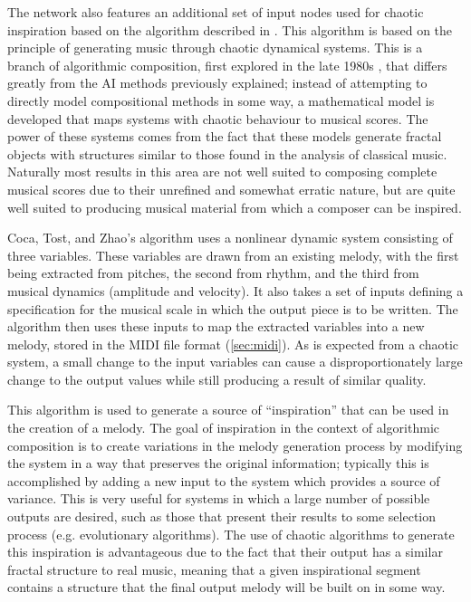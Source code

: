 \documentclass[ author={Stephen Livermore-Tozer},
				supervisor={Dr. Peter Flach},
				degree={MEng},
				title={Algorithmic Co-composition Using Machine Learning},
				subtitle={},
				type={research},
				year={2016} ]{dissertation}
\begin{document}
	The network also features an additional set of input nodes used for chaotic inspiration based on the algorithm described in \cite{coca2010characterizing}. This algorithm is based on the principle of generating music through chaotic dynamical systems. This is a branch of algorithmic composition, first explored in the late 1980s \cite{pressing1988nonlinear}, that differs greatly from the AI methods previously explained; instead of attempting to directly model compositional methods in some way, a mathematical model is developed that maps systems with chaotic behaviour to musical scores. The power of these systems comes from the fact that these models generate fractal objects with structures similar to those found in the analysis of classical music. Naturally most results in this area are not well suited to composing complete musical scores due to their unrefined and somewhat erratic nature, but are quite well suited to producing musical material from which a composer can be inspired.
	
	Coca, Tost, and Zhao's algorithm uses a nonlinear dynamic system consisting of three variables. These variables are drawn from an existing melody, with the first being extracted from pitches, the second from rhythm, and the third from musical dynamics (amplitude and velocity). It also takes a set of inputs defining a specification for the musical scale in which the output piece is to be written. The algorithm then uses these inputs to map the extracted variables into a new melody, stored in the MIDI file format (\ref{sec:midi}). As is expected from a chaotic system, a small change to the input variables can cause a disproportionately large change to the output values while still producing a result of similar quality.
	
	This algorithm is used to generate a source of ``inspiration'' that can be used in the creation of a melody. The goal of inspiration in the context of algorithmic composition is to create variations in the melody generation process by modifying the system in a way that preserves the original information; typically this is accomplished by adding a new input to the system which provides a source of variance. This is very useful for systems in which a large number of possible outputs are desired, such as those that present their results to some selection process (e.g. evolutionary algorithms). The use of chaotic algorithms to generate this inspiration is advantageous due to the fact that their output has a similar fractal structure to real music, meaning that a given inspirational segment contains a structure that the final output melody will be built on in some way.
	
\end{document}
